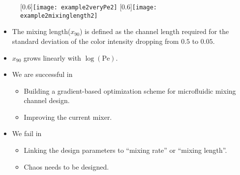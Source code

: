 \documentclass[dvips,landscape]{foils}
\renewcommand{\oursection}[1]{
\foilhead[-1.0cm]{#1}
}
\begin{document}
  \begin{figure}
    \centerline{
       \scalebox{0.6}[0.6]{\texttt{[image: example2veryPe2]}}
       \scalebox{0.6}[0.6]{\texttt{[image: example2mixinglength2]}}
    }
  \end{figure}
\begin{itemize}\setlength{\parskip}{0pt}  \setlength{\itemsep}{10pt} \setlength{\topsep}{0pt}
\item The mixing length($x_{90}$) is defined as the channel length required for the standard deviation of the color intensity dropping from $0.5$ to $0.05$. 
\item $x_{90}$ grows linearly with $\log(\text{Pe})$.
\end{itemize}


%


\newpage
\oursection{Conclusion}
\begin{itemize}
  \item We are successful in
    \begin{itemize}
       \item Building a gradient-based optimization scheme for microfluidic mixing channel design.
       \item Improving the current mixer. 
    \end{itemize}
  \item We fail in
    \begin{itemize}
       \item Linking the design parameters to ``mixing rate'' or ``mixing length''.
       \item Chaos needs to be designed.%
    \end{itemize}
\end{itemize}
\end{document}
